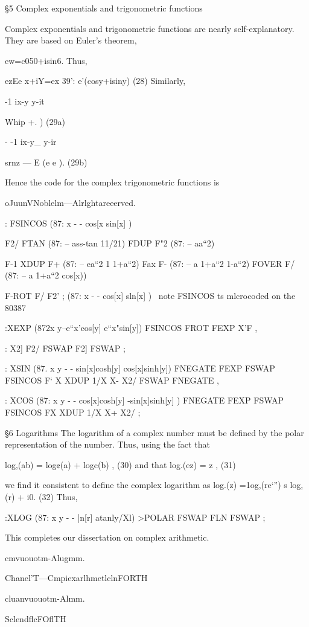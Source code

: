 §5 Complex exponentials and trigonometric functions

Complex exponentials and trigonometric functions are nearly
self-explanatory. They are based on Euler’s theorem,

ew=c050+isin6.
Thus,

ezEe x+iY=ex 39': e’(cosy+isiny) (28)
Similarly,

-1 ix-y y-it

Whip +. ) (29a)

- -1 ix-y_ y-ir

srnz — E (e e ). (29b)

Hence the code for the complex trigonometric functions is

oJuunVNoblelm—Alrlghtareeerved.

: FSINCOS (87: x - - cos[x sin[x] )

F2/ FTAN (87: -- ass-tan 11/21)
FDUP F"2 (87: -- aa“2)

F-1 XDUP F+ (87: -- ea“2 1 1+a“2)
Fax F- (87: -- a 1+a“2 1-a“2)
FOVER F/ (87: -- a 1+a“2 cos[x))

F-ROT F/ F2' ; (87: x - - cos[x] sln[x] )
\ note FSINCOS ts mlcrocoded on the 80387

:XEXP (872x y--e“x'cos[y] e“x"sin[y])
FSINCOS FROT FEXP X'F ,

: X2] F2/ FSWAP F2] FSWAP ;

: XSIN (87. x y - - sin[x]cosh[y] cos[x]sinh[y])
FNEGATE FEXP FSWAP FSINCOS F‘ X
XDUP 1/X X- X2/ FSWAP FNEGATE ,

: XCOS (87: x y - - cos[x]cosh[y] -sin[x]sinh[y] )
FNEGATE FEXP FSWAP FSINCOS FX
XDUP 1/X X+ X2/ ;

§6 Logarithms
The logarithm of a complex number must be deﬁned by the
polar representation of the number. Thus, using the fact that

log,(ab) = log¢(a) + logc(b) , (30)
and that
log.(ez) = z , (31)

we ﬁnd it consistent to define the complex logarithm as
log.(z) =1og,(re‘”) s log,(r) + i0. (32)
Thus,

:XLOG (87: x y - - |n[r] atanly/Xl)
>POLAR FSWAP FLN FSWAP ;

This completes our dissertation on complex arithmetic.

cmvuouotm-Alugmm.

Chanel’T—CmpiexarlhmetlclnFORTH

cluanvuouotm-Almm.

SclendﬂcFOflTH

